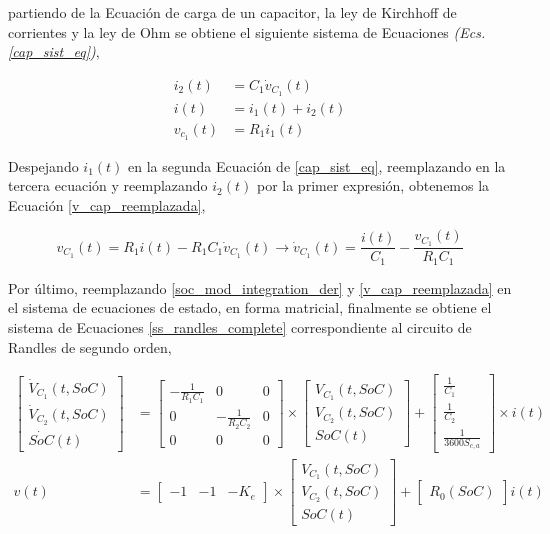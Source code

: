 \documentclass[10pt, a4paper]{article}
\begin{document}
partiendo de la Ecuaci\'on de carga de un capacitor, la ley de Kirchhoff de
corrientes y la ley de Ohm se obtiene el siguiente sistema de Ecuaciones
\emph{(Ecs. \ref{cap_sist_eq})},

\begin{align}
    i_2(t) &= C_1 \dot{v}_{C_1}(t)\nonumber\\
    i(t) &= i_1(t) + i_2(t)\label{cap_sist_eq}\\
    v_{c_1}(t) &= R_1i_1(t)\nonumber
\end{align}

Despejando $i_1(t)$ en la segunda Ecuaci\'on de \ref{cap_sist_eq}, reemplazando
en la tercera ecuaci\'on y reemplazando $i_2(t)$ por la primer expresi\'on,
obtenemos la Ecuaci\'on \ref{v_cap_reemplazada},

\begin{equation}
    v_{C_1}(t) = R_1i(t) - R_1C_1\dot{v}_{C_1}(t) \rightarrow 
    \dot{v}_{C_1}(t) = \frac{i(t)}{C_1} -
    \frac{v_{C_1}(t)}{R_1C_1}\label{v_cap_reemplazada}
\end{equation}

Por \'ultimo, reemplazando \ref{soc_mod_integration_der} y
\ref{v_cap_reemplazada} en el sistema de ecuaciones de estado, en forma
matricial, finalmente se obtiene el sistema de Ecuaciones 
\ref{ss_randles_complete} correspondiente al circuito de Randles de segundo
orden,

\begin{align}
    \begin{bmatrix}
        \dot{V}_{C_1}(t, SoC) \\ \dot{V}_{C_2}(t, SoC) \\ \dot{SoC}(t)
    \end{bmatrix} &= 
    \begin{bmatrix}
        -\frac{1}{R_1C_1} & 0 & 0\\
        0 & -\frac{1}{R_2C_2} & 0\\
        0 & 0 & 0
    \end{bmatrix}
    \times\begin{bmatrix}V_{C_1}(t, SoC) \\ V_{C_2}(t, SoC) \\ SoC(t)\end{bmatrix}
    +
    \begin{bmatrix}
        \frac{1}{C_1} \\ \frac{1}{C_2} \\ \frac{1}{3600S_{c,a}}
    \end{bmatrix}
    \times i(t)\nonumber \\
    v(t) &= \begin{bmatrix} -1 & -1 & -K_e \end{bmatrix} \times 
    \begin{bmatrix} V_{C_1}(t, SoC) \\ V_{C_2}(t, SoC) \\ SoC(t) \end{bmatrix} +
    \begin{bmatrix} R_0(SoC) \end{bmatrix} i(t)\label{ss_randles_complete}
\end{align}
\end{document}
